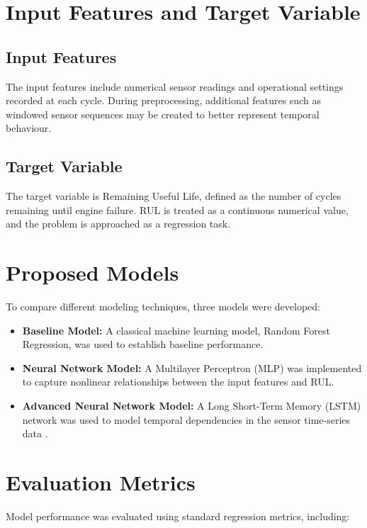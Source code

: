 \documentclass[conference]{IEEEtran}
\begin{document}
\section{Input Features and Target Variable}

\subsection{Input Features}
The input features include numerical sensor readings and operational settings recorded at each cycle. During preprocessing, additional features such as windowed sensor sequences may be created to better represent temporal behaviour.

\subsection{Target Variable}
The target variable is Remaining Useful Life, defined as the number of cycles remaining until engine failure. RUL is treated as a continuous numerical value, and the problem is approached as a regression task.

\section{Proposed Models}

To compare different modeling techniques, three models were developed:

\begin{itemize}
    \item \textbf{Baseline Model:} A classical machine learning model, Random Forest Regression, was used to establish baseline performance.

    \item \textbf{Neural Network Model:} A Multilayer Perceptron (MLP) was implemented to capture nonlinear relationships between the input features and RUL.

    \item \textbf{Advanced Neural Network Model:} A Long Short-Term Memory (LSTM) network was used to model temporal dependencies in the sensor time-series data \cite{ref4}.
\end{itemize}

\section{Evaluation Metrics}

Model performance was evaluated using standard regression metrics, including:
\end{document}
